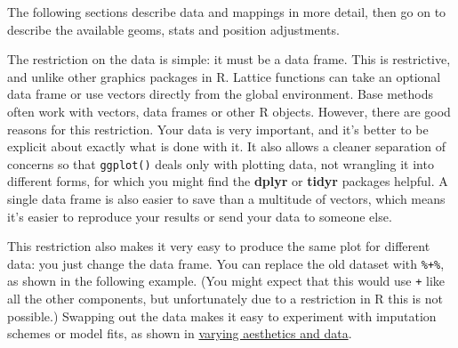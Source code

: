 The following sections describe data and mappings in more detail, then
go on to describe the available geoms, stats and position adjustments.


The restriction on the data is simple: it must be a data frame.
  This is restrictive, and unlike other
graphics packages in R. Lattice functions can take an optional data
frame or use vectors directly from the global environment. Base methods
often work with vectors, data frames or other R objects. However, there
are good reasons for this restriction. Your data is very important, and
it's better to be explicit about exactly what is done with it. It also
allows a cleaner separation of concerns so that \texttt{ggplot()} deals
only with plotting data, not wrangling it into different forms, for
which you might find the \textbf{dplyr} or \textbf{tidyr} packages
helpful. A single data frame is also easier to save than a multitude of
vectors, which means it's easier to reproduce your results or send your
data to someone else.

This restriction also makes it very easy to produce the same plot for
different data: you just change the data frame. You can replace the old
dataset with \texttt{\%+\%}, as shown in the following example.
 (You might expect that this would use \texttt{+}
like all the other components, but unfortunately due to a restriction in
R this is not possible.) \indexc{\%+\%} Swapping out the data makes it
easy to experiment with imputation schemes or model fits, as shown in
\hyperref[sub:different-aesthetics]{varying aesthetics and data}.

\begin{Shaded}
\end{Shaded}

